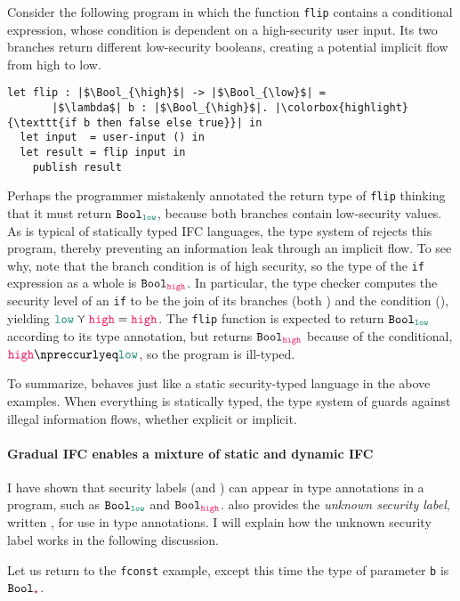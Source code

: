 Consider the following program in which the function \texttt{flip} contains a
conditional expression, whose condition is dependent on a high-security user
input. Its two branches return different low-security booleans, creating a
potential implicit flow from high to low.

\begin{lstlisting}[style=tt]
  let flip : |$\Bool_{\high}$| -> |$\Bool_{\low}$| =
       |$\lambda$| b : |$\Bool_{\high}$|. |\colorbox{highlight}{\texttt{if b then false else true}}| in
  let input  = user-input () in
  let result = flip input in
    publish result
\end{lstlisting}

\noindent Perhaps the programmer mistakenly annotated the return type of
\texttt{flip} thinking that it must return $\Bool_{\low}$, because both branches
contain low-security values. As is typical of statically typed IFC languages,
the type system of \Surface rejects this program, thereby preventing an
information leak through an implicit flow. To see why, note that the branch
condition is of high security, so the type of the \texttt{if} expression as a
whole is $\Bool_{\high}$. In particular, the type checker computes the security
level of an \texttt{if} to be the join of its branches (both \low) and the
condition (\high), yielding $\low \curlyvee \high = \high$. The \texttt{flip}
function is expected to return $\Bool_{\low}$ according to its type annotation,
but returns $\Bool_{\high}$ because of the conditional, $\high \npreccurlyeq
\low$, so the program is ill-typed.

To summarize, \Surface behaves just like a static security-typed language in the
above examples. When everything is statically typed, the type system of \Surface
guards against illegal information flows, whether explicit or implicit.

\paragraph{Gradual IFC enables a mixture of static and dynamic IFC}

I have shown that security labels (\low and \high) can appear in type
annotations in a program, such as $\Bool_{\low}$ and $\Bool_{\high}$. \Surface
also provides the \textit{unknown security label}, written \unk, for use in type
annotations. I will explain how the unknown security label works in the
following discussion.

Let us return to the \texttt{fconst} example, except this time the type of
parameter \texttt{b} is $\Bool_{\unk}$.

